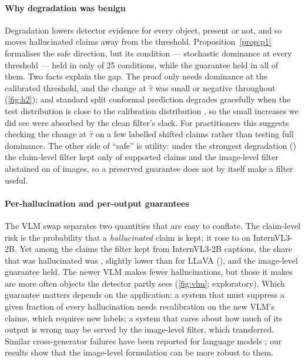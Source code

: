 \paragraph{Why degradation was benign} Degradation lowers detector evidence for every object, present or not, and so moves hallucinated claims away from the threshold. Proposition~\ref{prop:p1} formalises the safe direction, but its condition --- stochastic dominance at every threshold --- held in only \NHtwo{} of 25 conditions, while the guarantee held in all of them. Two facts explain the gap. The proof only needs dominance at the calibrated threshold, and the change at $\hat\tau$ was small or negative throughout (\cref{fig:h2}); and standard split conformal prediction degrades gracefully when the test distribution is close to the calibration distribution \citep{barber2023beyond}, so the small increases we did see were absorbed by the clean filter's slack. For practitioners this suggests checking the change at $\hat\tau$ on a few labelled shifted claims rather than testing full dominance. The other side of ``safe'' is utility: under the strongest degradation (\MinKeptSoneCond{}) the claim-level filter kept only \MinKeptSone{} of supported claims and the image-level filter abstained on \MaxAbstSone{} of images, so a preserved guarantee does not by itself make a filter useful.

\paragraph{Per-hallucination and per-output guarantees} The VLM swap separates two quantities that are easy to conflate. The claim-level risk is the probability that a \emph{hallucinated} claim is kept; it rose to \InternClaim{} on InternVL3-2B. Yet among the claims the filter kept from InternVL3-2B captions, the share that was hallucinated was \InternKeptHall{}, slightly lower than for LLaVA (\CleanKeptHall{}), and the image-level guarantee held. The newer VLM makes fewer hallucinations, but those it makes are more often objects the detector partly sees (\cref{fig:vlm}; exploratory). Which guarantee matters depends on the application: a system that must suppress a given fraction of every hallucination needs recalibration on the new VLM's claims, which requires new labels; a system that cares about how much of its output is wrong may be served by the image-level filter, which transferred. Similar cross-generator failures have been reported for language models \citep{chen2026conformalrag}; our results show that the image-level formulation can be more robust to them.

